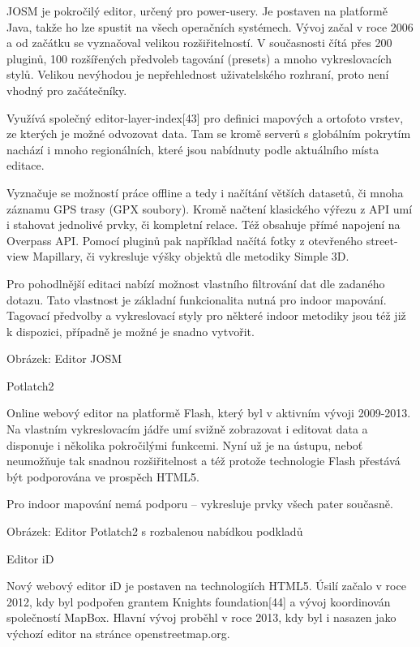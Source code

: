 JOSM je pokročilý editor, určený pro power-usery. Je postaven na platformě Java, takže ho lze spustit na všech operačních systémech. Vývoj začal v roce 2006 a od začátku se vyznačoval velikou rozšiřitelností. V současnosti čítá přes 200 pluginů, 100 rozšířených předvoleb tagování (presets) a mnoho vykreslovacích stylů. Velikou nevýhodou je nepřehlednost uživatelského rozhraní, proto není vhodný pro začátečníky.

Využívá společný editor-layer-index[43] pro definici mapových a ortofoto vrstev, ze kterých je možné odvozovat data. Tam se kromě serverů s globálním pokrytím nachází i mnoho regionálních, které jsou nabídnuty podle aktuálního místa editace.

Vyznačuje se možností práce offline a tedy i načítání větších datasetů, či mnoha záznamu GPS trasy (GPX soubory). Kromě načtení klasického výřezu z API umí i stahovat jednolivé prvky, či kompletní relace. Též obsahuje přímé napojení na Overpass API. Pomocí pluginů pak například načítá fotky z otevřeného street-view Mapillary, či vykresluje výšky objektů dle metodiky Simple 3D.

Pro pohodlnější editaci nabízí možnost vlastního filtrování dat dle zadaného dotazu. Tato vlastnost je základní funkcionalita nutná pro indoor mapování. Tagovací předvolby a vykreslovací styly pro některé indoor metodiky jsou též již k dispozici, případně je možné je snadno vytvořit.



Obrázek: Editor JOSM

Potlatch2



Online webový editor na platformě Flash, který byl v aktivním vývoji 2009-2013. Na vlastním vykreslovacím jádře umí svižně zobrazovat i editovat data a disponuje i několika pokročilými funkcemi. Nyní už je na ústupu, neboť neumožňuje tak snadnou rozšiřitelnost a též protože technologie Flash přestává být podporována ve prospěch HTML5.

Pro indoor mapování nemá podporu – vykresluje prvky všech pater současně.



Obrázek: Editor Potlatch2 s rozbalenou nabídkou podkladů



Editor iD



Nový webový editor iD je postaven na technologiích HTML5. Úsilí začalo v roce 2012, kdy byl podpořen grantem Knights foundation[44] a vývoj koordinován společností MapBox. Hlavní vývoj proběhl v roce 2013, kdy byl i nasazen jako výchozí editor na stránce openstreetmap.org.

